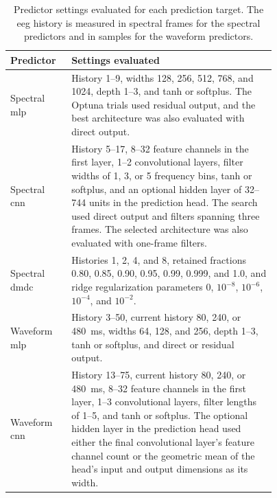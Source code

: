 \begin{table}[!htbp] %
  \centering
  \small
  \caption{Predictor settings evaluated for each prediction target.
  The \ac{eeg} history is measured in spectral frames for the spectral predictors and in samples for the waveform predictors.}\label{tab:predictor_search_spaces}
  \begin{tabular}{@{}lp{0.77\linewidth}@{}}
    \toprule
    Predictor & Settings evaluated \\
    \midrule
    Spectral \ac{mlp} &
    History 1--9, widths 128, 256, 512, 768, and 1024, depth 1--3, and tanh or softplus.
    The Optuna trials used residual output, and the best architecture was also evaluated with direct output. \\
    Spectral \ac{cnn} &
    History 5--17, 8--32 feature channels in the first layer, 1--2 convolutional layers, filter widths of 1, 3, or 5 frequency bins, tanh or softplus, and an optional hidden layer of 32--744 units in the prediction head.
    The search used direct output and filters spanning three frames. The selected architecture was also evaluated with one-frame filters. \\
    Spectral \ac{dmdc} &
    Histories 1, 2, 4, and 8, retained fractions 0.80, 0.85, 0.90, 0.95, 0.99, 0.999, and 1.0, and ridge regularization parameters $0$, $10^{-8}$, $10^{-6}$, $10^{-4}$, and $10^{-2}$. \\
    Waveform \ac{mlp} &
    History 3--50, current history 80, 240, or \SI{480}{\milli\second}, widths 64, 128, and 256, depth 1--3, tanh or softplus, and direct or residual output. \\
    Waveform \ac{cnn} &
    History 13--75, current history 80, 240, or \SI{480}{\milli\second}, 8--32 feature channels in the first layer, 1--3 convolutional layers, filter lengths of 1--5, and tanh or softplus.
    The optional hidden layer in the prediction head used either the final convolutional layer's feature channel count or the geometric mean of the head's input and output dimensions as its width. \\
    \bottomrule
  \end{tabular}
\end{table}

